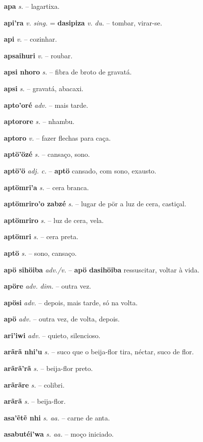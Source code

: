 \textbf{apa} \textit{s.} -- lagartixa.

\textbf{api'ra} \textit{v. sing.} = \textbf{dasipiza} \textit{v. du.} -- tombar, virar-se.

\textbf{api} \textit{v.} -- cozinhar.

\textbf{apsaihuri} \textit{v.} -- roubar.

\textbf{apsi nhoro} \textit{s.} -- fibra de broto de gravatá.

\textbf{apsi} \textit{s.} -- gravatá, abacaxi.

\textbf{apto'oré} \textit{adv.} -- mais tarde.

\textbf{aptorore} \textit{s.} -- nhambu.

\textbf{aptoro} \textit{v.} -- fazer flechas para caça.

\textbf{aptö'özé} \textit{s.} -- cansaço, sono.

\textbf{aptö'ö} \textit{adj. c.} -- \textbf{aptö} cansado, com sono, exausto.

\textbf{aptömri'a} \textit{s.} -- cera branca.

\textbf{aptömriro'o zabzé} \textit{s.} -- lugar de pör a luz de cera, castiçal.

\textbf{aptömriro} \textit{s.} -- luz de cera, vela.

\textbf{aptömri} \textit{s.} -- cera preta.

\textbf{aptö} \textit{s.} -- sono, cansaço.

\textbf{apö sihöiba} \textit{adv./v.} -- \textbf{apö dasihöiba} ressuscitar, voltar à vida.

\textbf{apöre} \textit{adv. dim.} -- outra vez.

\textbf{apösi} \textit{adv.} -- depois, mais tarde, só na volta.

\textbf{apö} \textit{adv.} -- outra vez, de volta, depois.

\textbf{ari'iwi} \textit{adv.} -- quieto, silencioso.

\textbf{arãrã nhi'u} \textit{s.} -- suco que o beija-flor tira, néctar, suco de flor.

\textbf{arãrã'rã} \textit{s.} -- beija-flor preto.

\textbf{arãrãre} \textit{s.} -- colibri.

\textbf{arãrã} \textit{s.} -- beija-flor.

\textbf{asa'ẽtẽ nhi} \textit{s. aa.} -- carne de anta.

\textbf{asabutéi'wa} \textit{s. aa.} -- moço iniciado.

